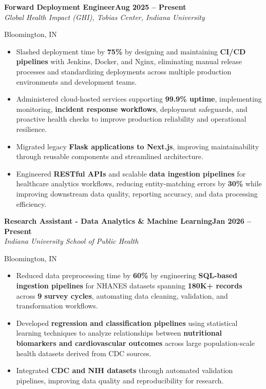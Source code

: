 \documentclass[letterpaper,8pt]{extarticle}
\newcommand{\entryline}[3]{%
  \noindent\textbf{#1}\hfill\textbf{#2} \\
  \noindent\textit{#3}%
}
\begin{document}
\entryline
{Forward Deployment Engineer}
{Aug 2025 -- Present}
{Global Health Impact (GHI), Tobias Center, Indiana University}
{Bloomington, IN}
\vspace{0pt}
\begin{itemize}
    \item Slashed deployment time by \textbf{75\%} by designing and maintaining \textbf{CI/CD pipelines} with Jenkins, Docker, and Nginx, eliminating manual release processes and standardizing deployments across multiple production environments and development teams.

    \item Administered cloud-hosted services supporting \textbf{99.9\% uptime}, implementing monitoring, \textbf{incident response workflows}, deployment safeguards, and proactive health checks to improve production reliability and operational resilience.

    \item Migrated legacy \textbf{Flask applications to Next.js}, improving maintainability through reusable components and streamlined architecture.

    \item Engineered \textbf{RESTful APIs} and scalable \textbf{data ingestion pipelines} for healthcare analytics workflows, reducing entity-matching errors by \textbf{30\%} while improving downstream data quality, reporting accuracy, and data processing efficiency.
\end{itemize}

\vspace{0pt}

\entryline
{Research Assistant - Data Analytics \& Machine Learning}
{Jan 2026 -- Present}
{Indiana University School of Public Health}
{Bloomington, IN}
\vspace{0pt}
\begin{itemize}
    \item Reduced data preprocessing time by \textbf{60\%} by engineering \textbf{SQL-based ingestion pipelines} for NHANES datasets spanning \textbf{180K+ records} across \textbf{9 survey cycles}, automating data cleaning, validation, and transformation workflows.

    \item Developed \textbf{regression and classification pipelines} using statistical learning techniques to analyze relationships between \textbf{nutritional biomarkers and cardiovascular outcomes} across large population-scale health datasets derived from CDC sources.

    \item Integrated \textbf{CDC and NIH datasets} through automated validation pipelines, improving data quality and reproducibility for research.
\end{itemize}
\end{document}
